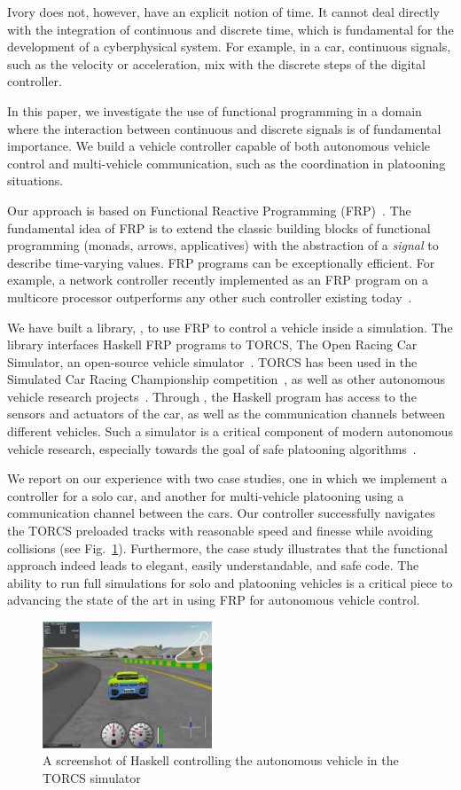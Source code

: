 Ivory does not, however, have an explicit notion of time.
It cannot deal directly with the integration of 
continuous and discrete time, which is fundamental for the
development of a cyberphysical system. For example,
in a car, continuous signals, such as the velocity or acceleration,
mix with the discrete steps of the digital controller.

In this paper, we investigate the use of functional programming
in a domain where the interaction between continuous and discrete signals
is of fundamental importance. We build a vehicle controller capable
of both autonomous vehicle control and multi-vehicle communication,
such as the coordination in platooning situations.

Our approach is based on Functional Reactive Programming
(FRP)~\cite{hudak2003arrows,hudak2000haskell}.
The fundamental idea of FRP is to extend the classic building blocks 
of functional programming (\eg monads, arrows,
applicatives)
with the abstraction of a \emph{signal} to
describe time-varying values. FRP programs can be exceptionally
efficient.  For example, a network controller recently implemented as
an FRP program on a multicore processor outperforms any other such
controller existing today~\cite{Voellmy:2012:SSD:2377677.2377735}.

We have built a library, \ourLib, to use FRP to control a vehicle inside a simulation.
The library interfaces Haskell FRP programs to TORCS, The Open Racing Car Simulator, an open-source vehicle simulator~\cite{torcs}.
TORCS has been used in the Simulated Car Racing Championship competition~\cite{SCRC}, as well as other autonomous vehicle research projects~\cite{xu2016experimental,OnievaPAMP09,conf/cig/CardamoneLL09,conf/cig/MunozGS10}. 
Through \ourLib, the Haskell program has access to the sensors and actuators of the car, as well
as the communication channels between different vehicles.
Such a simulator is a  critical component of modern autonomous vehicle research, especially towards the goal of safe platooning algorithms~\cite{kamali2016formal}.

We report on our experience with two case studies, one in which we implement a controller for a solo car, and another for multi-vehicle platooning using a communication channel between the cars.
Our controller successfully navigates the TORCS preloaded tracks with reasonable speed and finesse while avoiding collisions (see Fig.~\ref{fig:race}).
Furthermore, the case study illustrates that the functional approach indeed leads to elegant, easily understandable, and safe code.
The ability to run full simulations for solo and platooning vehicles is a critical piece to advancing the state of the art in using FRP for autonomous vehicle control.

\begin{figure}[t]
\includegraphics[width=0.45\textwidth]{figs/racing.png}
\caption{A screenshot of Haskell controlling the autonomous vehicle in the TORCS simulator}
\label{fig:race}
\end{figure}
